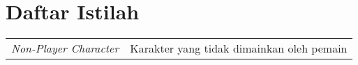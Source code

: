 \chapter*{Daftar Istilah}

\begingroup
\def\arraystretch{1.25}
\begin{tabular}{p{4cm}l}
	\textit{Non-Player Character} & Karakter yang tidak dimainkan oleh pemain \\
\end{tabular}
\endgroup
